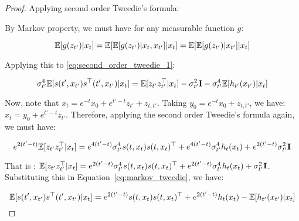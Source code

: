 \begin{proof}
Applying second order Tweedie's formula:
    
    By Markov property, we must have for any measurable function $g$:
    
    $$\mathbb{E}[g(z_{t'})|x_t] = \mathbb{E}[\mathbb{E}[g(z_{t'})|x_t,x_{t'}]|x_{t}] = \mathbb{E}[\mathbb{E}[g(z_{t'})|x_{t'}]|x_{t}] $$
    
    Applying this to \eqref{eq:second_order_tweedie_1}:
    
    \begin{equation}\label{eq:markov_tweedie}
    \sigma_{t'}^4 \mathbb{E}[s(t', x_{t'})s^{\top}(t', x_{t'})|x_t] = \mathbb{E}[z_{t'}z_{t'}^{\top}|x_{t}] - \sigma_{t'}^2 \mathbf{I} - \sigma^4_{t'}\mathbb{E}[h_{t'}(x_{t'})|x_t]\end{equation}
    
    Now, note that $x_t = e^{-t}x_0 + e^{t'-t}z_{t'} + z_{t,t'}$. Taking $y_0 = e^{-t}x_0 + z_{t,t'}$, we have: $x_t = y_0 + e^{t'-t}z_{t'}$. Therefore, applying the second order Tweedie's formula again, we must have:
    
    $$e^{2(t'-t)}\mathbb{E}[z_{t'}z_{t'}^{\top}|x_{t}] = e^{4(t'-t)}\sigma_{t'}^{4} s(t, x_t)s(t, x_t)^{\top} + e^{4(t'-t)}\sigma_{t'}^{4}h_{t}(x_t) + e^{2(t'-t)}\sigma_{t'}^{2}\mathbf{I}$$
    
    That is : $\mathbb{E}[z_{t'}z_{t'}^{\top}|x_{t}] = e^{2(t'-t)}\sigma_{t'}^{4} s(t, x_t)s(t, x_t)^{\top} + e^{2(t'-t)}\sigma_{t'}^{4}h_{t}(x_t) + \sigma_{t'}^{2}\mathbf{I}$.
    Substituting this in Equation~\eqref{eq:markov_tweedie}, we have:
    
    $$  \mathbb{E}[s(t', x_{t'})s^{\top}(t', x_{t'})|x_t] =   e^{2(t'-t)} s(t, x_t)s(t, x_t)^{\top} + e^{2(t'-t)}h_{t}(x_t) -\mathbb{E}[h_{t'}(x_{t'})|x_t]$$
\end{proof}

